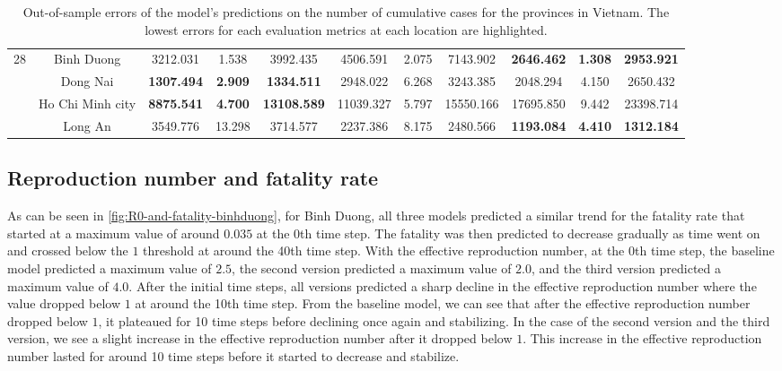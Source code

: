 \begin{landscape}
\begin{table}[!htb]
\begin{tabular}{| c | c | c | c | c | c | c | c | c | c | c |}
        \multirow{4}{*}{28}
            & Binh Duong & 3212.031 & 1.538 & 3992.435 & 4506.591 & 2.075 & 7143.902 & \textbf{2646.462} & \textbf{1.308} & \textbf{2953.921} \\
            & Dong Nai & \textbf{1307.494} & \textbf{2.909} & \textbf{1334.511} & 2948.022 & 6.268 & 3243.385 & 2048.294 & 4.150 & 2650.432 \\
            & Ho Chi Minh city & \textbf{8875.541} & \textbf{4.700} & \textbf{13108.589} & 11039.327 & 5.797 & 15550.166 & 17695.850 & 9.442 & 23398.714 \\
            & Long An & 3549.776 & 13.298 & 3714.577 & 2237.386 & 8.175 & 2480.566 & \textbf{1193.084} & \textbf{4.410} & \textbf{1312.184} \\ \hline
    \end{tabular}
    \caption{Out-of-sample errors of the model's predictions on the number of cumulative cases for the provinces in Vietnam. The lowest errors for each evaluation metrics at each location are highlighted.}
    \label{tab:errors-vn-provinces-total-cases}
\end{table}
\end{landscape}

\subsection{Reproduction number and fatality rate}

As can be seen in \autoref{fig:R0-and-fatality-binhduong}, for Binh Duong, all three models predicted a similar trend for the fatality rate that started at a maximum value of around $0.035$ at the 0th time step.
The fatality was then predicted to decrease gradually as time went on and crossed below the $1$ threshold at around the 40th time step.
With the effective reproduction number, at the 0th time step, the baseline model predicted a maximum value of $2.5$, the second version predicted a maximum value of $2.0$, and the third version predicted a maximum value of $4.0$.
After the initial time steps, all versions predicted a sharp decline in the effective reproduction number where the value dropped below $1$ at around the 10th time step.
From the baseline model, we can see that after the effective reproduction number dropped below $1$, it plateaued for 10 time steps before declining once again and stabilizing.
In the case of the second version and the third version, we see a slight increase in the effective reproduction number after it dropped below $1$.
This increase in the effective reproduction number lasted for around 10 time steps before it started to decrease and stabilize.

